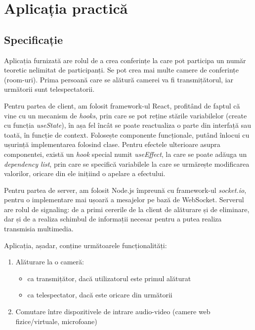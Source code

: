 \chapter{Aplicația practică}
\label{chap:ch6}

\section{Specificație}
\label{chap:ch6sec1}
\indent \par Aplicația furnizată are rolul de a crea conferințe la care pot participa un număr teoretic nelimitat de participanți. Se pot crea mai multe camere de conferințe (room-uri). Prima persoană care se alătură camerei va fi transmițătorul, iar următorii sunt telespectatorii. 
\indent \par Pentru partea de client, am folosit framework-ul React, profitând de faptul că vine cu un mecanism de \textit{hooks}, prin care se pot reține stările variabilelor (create cu funcția \textit{useState}), în așa fel încât se poate reactualiza o parte din interfață sau toată, în funcție de context. Folosește componente funcționale, putând înlocui cu ușurință implementarea folosind clase. Pentru efectele ulterioare asupra componentei, există un \textit{hook} special numit \textit{useEffect}, la care se poate adăuga un \textit{dependency list}, prin care se specifică variabilele la care se urmărește modificarea valorilor, oricare din ele inițiind o apelare a efectului.
\indent \par Pentru partea de server, am folosit Node.js împreună cu framework-ul \textit{socket.io}, pentru o implementare mai ușoară a mesajelor pe bază de WebSocket. Serverul are rolul de signaling: de a primi cererile de la client de alăturare și de eliminare, dar și de a realiza schimbul de informații necesar pentru a putea realiza transmisia multimedia.
\indent \par Aplicația, așadar, conține următoarele funcționalități:
\begin{enumerate}
    \item Alăturare la o cameră:
    \begin{itemize}
        \item ca transmițător, dacă utilizatorul este primul alăturat
        \item ca telespectator, dacă este oricare din următorii
    \end{itemize}
    \item Comutare între dispozitivele de intrare audio-video (camere web fizice/virtuale, microfoane)
\end{enumerate}
